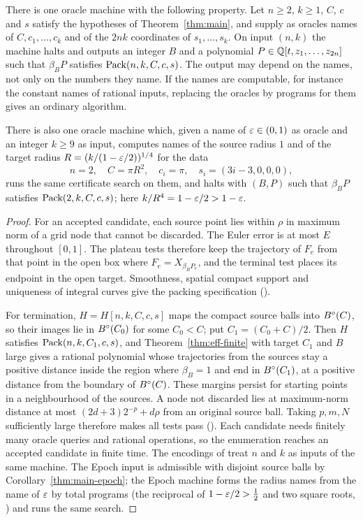 \begin{theorem}\label{thm:eff-algorithm}
There is one oracle machine with the following property. Let $n\ge2$, $k\ge1$, $C$, $c$ and $s$ satisfy the
hypotheses of Theorem~\ref{thm:main}, and supply as oracles names of $C,c_1,\dots,c_k$ and of the $2nk$ coordinates
of $s_1,\dots,s_k$. On input $(n,k)$ the machine halts and outputs an integer $B$ and a polynomial
$P\in\mathbb{Q}[t,z_1,\ldots,z_{2n}]$ such that $\beta_BP$ satisfies $\mathrm{Pack}(n,k,C,c,s)$. The output may depend on the names,
not only on the numbers they name. If the names are computable, for instance the constant names of rational
inputs, replacing the oracles by programs for them gives an ordinary algorithm.

There is also one oracle machine which, given a name of $\varepsilon\in(0,1)$ as oracle and an integer $k\ge9$ as input,
computes names of the source radius $1$ and of the target radius $R=(k/(1-\varepsilon/2))^{1/4}$ for the data
\[
 n=2,\quad C=\pi R^2,\quad c_i=\pi,\quad s_i=(3i-3,0,0,0),
\]
runs the same certificate search on them, and halts with $(B,P)$ such that $\beta_BP$ satisfies $\mathrm{Pack}(2,k,C,c,s)$;
here $k/R^4=1-\varepsilon/2>1-\varepsilon$.
\end{theorem}

\begin{proof}
For an accepted candidate, each source point lies within $\rho$ in maximum norm
of a grid node that cannot be discarded. The Euler error is at most $E$ throughout
$[0,1]$. The plateau tests therefore keep the trajectory of $F_e$ from that point in the open
box where $F_e=X_{\beta_BP_e}$, and the terminal test places its endpoint in the
open target. Smoothness, spatial compact support and uniqueness of integral curves give the
packing specification ().

For termination, $H=H[n,k,C,c,s]$ maps the compact source balls into $B^{\circ}(C)$, so their images lie in $B^{\circ}(C_0)$
for some $C_0<C$; put $C_1=(C_0+C)/2$. Then $H$ satisfies $\mathrm{Pack}(n,k,C_1,c,s)$, and Theorem~\ref{thm:eff-finite} with
target $C_1$ and $B$ large gives a rational polynomial whose trajectories from the sources stay a positive distance
inside the region where $\beta_B=1$ and end in $B^{\circ}(C_1)$, at a positive distance from the boundary of $B^{\circ}(C)$.
These margins persist for starting points in a neighbourhood of the sources.
A node not discarded lies at maximum-norm distance at most
$(2d+3)2^{-p}+d\rho$ from an original source ball. Taking $p,m,N$ sufficiently
large therefore makes all tests pass (). Each candidate needs finitely many
oracle queries and rational operations, so the enumeration reaches an accepted candidate in finite time. The
encodings of  treat $n$ and $k$ as inputs of the same machine. The Epoch input is
admissible with disjoint source balls by Corollary~\ref{thm:main-epoch}; the Epoch machine forms the radius names
from the name of $\varepsilon$ by total programs (the reciprocal of $1-\varepsilon/2>\frac12$ and two square roots,
) and runs the same search.
\end{proof}

